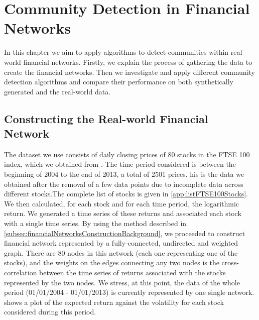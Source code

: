 
\chapter{Community Detection in Financial Networks}

\label{cha:communityDetectionFinancialNetworks}


In this chapter we aim to apply algorithms to detect communities within real-world financial networks.
Firstly, we explain the process of gathering the data to create the financial networks.
Then we investigate and apply different community detection algorithms and compare their performance on both synthetically generated and the real-world data.


\section{Constructing the Real-world Financial Network}
\label{sec:realWorldFinancialNetwork}

The dataset we use consists of daily closing prices of 80 stocks in the FTSE 100 index, which we obtained from \cite{YahFi}.
The time period considered is between the beginning of 2004 to the end of 2013, a total of 2501 prices. 
his is the data we obtained after the removal of a few data points due to incomplete data across different stocks.The complete list of stocks is given in \cref{app:listFTSE100Stocks}.
We then calculated, for each stock and for each time period, the logarithmic return. We generated a time series of these returns and associated each stock with a single time series.
By using the method described in \cref{subsec:financialNetworksConstructionBackground}, we proceeded to construct financial network represented by a fully-connected, undirected and weighted graph. There are 80 nodes in this network (each one representing one of the stocks), and the weights on the edges connecting any two nodes is the cross-correlation between the time series of returns associated with the stocks represented by the two nodes.
We stress, at this point, the data of the whole period (01/01/2004 - 01/01/2013) is currently represented by one single network.
 shows a plot of the expected return against the volatility for each stock considered during this period.

